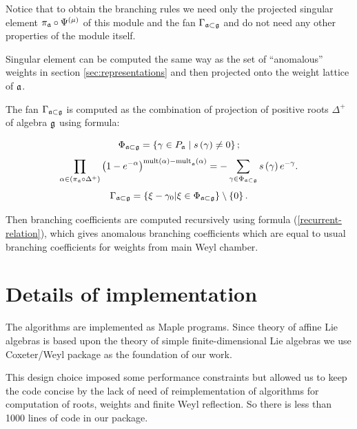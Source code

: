 \documentclass[a4paper,12pt]{article}
\theoremstyle{definition} \newtheorem{Def}{Definition}
\begin{document}
Notice that to obtain the branching
rules we need only the projected singular element $\pi _{\frak{a}}\circ \Psi
^{\left( \mu\right) }$ of this module 
and the fan $\Gamma
_{\frak{a}\subset \frak{g}}$ and do not need any other properties of the module itself. 

Singular element can be computed the same way as the set of ``anomalous''
weights in section \ref{sec:representations} and then projected onto
the weight lattice of $\frak{a}$. 

The fan $\Gamma_{\frak{a}\subset \frak{g}}$ is computed as the
combination of projection of positive roots $\Delta^{+}$ of algebra
$\frak{g}$ using formula:

\begin{equation}
  \label{phi-d}
  \Phi _{\frak{a}\subset \frak{g}}=\left\{ \gamma \in P_{\frak{a}}\mid s\left(
      \gamma \right) \neq 0\right\} ;  
\end{equation}
\begin{equation}
  \label{fan-d}
  \prod_{\alpha \in \left( \pi _{\frak{a}}\circ \Delta ^{+}\right) }\left(
    1-e^{-\alpha }\right) ^{\mathrm{{mult}\left( \alpha \right) -{mult}}_{\frak{a%
      }}\mathrm{\left( \alpha \right) }}=-\sum_{\gamma \in \Phi _{\frak{a}\subset 
      \frak{g}}}s\left( \gamma \right) e^{-\gamma }.  
\end{equation}
\begin{equation}
  \label{fan-defined}
  \Gamma _{\frak{a}\subset \frak{g}}=\left\{ \xi -\gamma _{0}|\xi \in \Phi _{%
      \frak{a}\subset \frak{g}}\right\} \setminus \left\{ 0\right\} .
\end{equation}

Then branching coefficients are computed recursively using formula
(\ref{recurrent-relation}), which gives anomalous branching
coefficients which are equal to usual branching coefficients for
weights from main Weyl chamber. 

\section{Details of implementation}
\label{sec:details-implementation}

The algorithms are implemented as Maple programs. Since theory of
affine Lie algebras is based upon the theory of simple
finite-dimensional Lie algebras we use Coxeter/Weyl package
\cite{stembridge1995mps} as the foundation of our work.

This design choice imposed some performance constraints but allowed us
to keep the code concise by the lack of need of reimplementation of
algorithms for computation of roots, weights and finite Weyl
reflection. So there is less than 1000 lines of code in our package.
\end{document}
